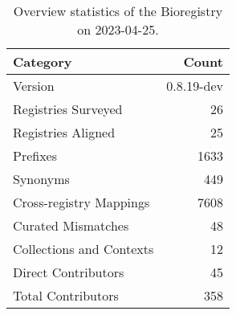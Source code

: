 \begin{table}
\caption{Overview statistics of the Bioregistry on 2023-04-25.}
\label{tab:bioregistry-summary}
\begin{tabular}{lr}
\toprule
Category & Count \\
\midrule
Version & 0.8.19-dev \\
Registries Surveyed & 26 \\
Registries Aligned & 25 \\
Prefixes & 1633 \\
Synonyms & 449 \\
Cross-registry Mappings & 7608 \\
Curated Mismatches & 48 \\
Collections and Contexts & 12 \\
Direct Contributors & 45 \\
Total Contributors & 358 \\
\bottomrule
\end{tabular}
\end{table}
